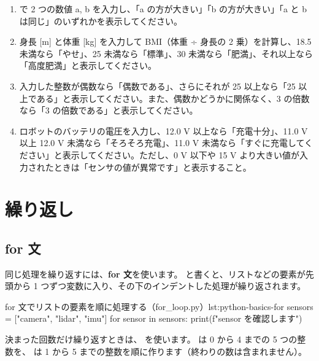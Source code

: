 \begin{exercise}
\begin{enumerate}
  \item {} で 2 つの数値 a, b を入力し、「a の方が大きい」「b の方が大きい」「a と b は同じ」のいずれかを表示してください。
  \item 身長 [m] と体重 [kg] を入力して BMI（体重 ÷ 身長の 2 乗）を計算し、18.5 未満なら「やせ」、25 未満なら「標準」、30 未満なら「肥満」、それ以上なら「高度肥満」と表示してください。
  \item 入力した整数が偶数なら「偶数である」、さらにそれが 25 以上なら「25 以上である」と表示してください。また、偶数かどうかに関係なく、3 の倍数なら「3 の倍数である」と表示してください。
  \item ロボットのバッテリの電圧を入力し、12.0 V 以上なら「充電十分」、11.0 V 以上 12.0 V 未満なら「そろそろ充電」、11.0 V 未満なら「すぐに充電してください」と表示してください。ただし、0 V 以下や 15 V より大きい値が入力されたときは「センサの値が異常です」と表示すること。
\end{enumerate}
\end{exercise}

\section{繰り返し}
\label{sec:python-basics-loop}

\subsection{for 文}

同じ処理を繰り返すには、\textbf{for 文}を使います。
 と書くと、リストなどの要素が先頭から 1 つずつ変数に入り、その下のインデントした処理が繰り返されます。

\begin{codelisting}[style=python]{for 文でリストの要素を順に処理する（for\_loop.py）}{lst:python-basics-for}
sensors = ["camera", "lidar", "imu"]
for sensor in sensors:
    print(f"{sensor} を確認します")
\end{codelisting}


決まった回数だけ繰り返すときは、 を使います。
 は 0 から 4 までの 5 つの整数を、 は 1 から 5 までの整数を順に作ります（終わりの数は含まれません）。

